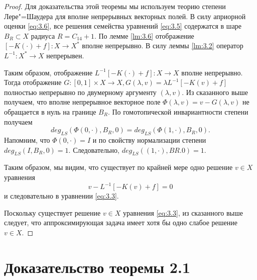 \begin{proof}
    Для доказательства этой теоремы мы используем теорию степени Лере"=Шаудера для вполне непрерывных 
    векторных полей. В силу априорной оценки \ref{eq:3.6}, все решения семейства уравнений \ref{eq:3.5} содержатся в шаре 
    $B_R \subset X$ радиуса $R = C_{14} +1$. По лемме \ref{lm:3.6} отображение $[-K (\cdot) + f]: X \rightarrow X^*$
    вполне непрерывно. В силу леммы \ref{lm:3.2} оператор $L^{-1}: X^*\rightarrow X$ непрерывен.

    Таким образом, отображение $L^{-1}[-K (\cdot) + f]: X \rightarrow X$ вполне непрерывно.  
    Тогда отображение $G:[0, 1] \times X\rightarrow X, G (\lambda, v) = \lambda L^{-1}[- K (v) + f]$ 
    полностью непрерывно по двумерному аргументу $(\lambda, v)$.  Из сказанного выше получаем, что вполне непрерывное 
    векторное поле $\Phi(\lambda, v) = v - G (\lambda, v)$ не обращается в нуль на границе $B_R$. По гомотопической 
    инвариантности степени получаем
    $$deg_{LS}(\Phi(0,\cdot),B_R,0)=deg_{LS}(\Phi(1,\cdot),B_R,0).$$
    Напомним, что $\Phi(0,\cdot) = I$ и по свойству нормализации степени $deg_{LS} (I, B_R, 0) = 1$. 
    Следовательно, $deg_{LS} ((1,\cdot), BR.0) = 1$. 
    
    Таким образом, мы видим, что существует по крайней мере одно решение $v\in X$ уравнения
    $$v-L^{-1}[-K(v)+f]=0$$
    и следовательно в уравнении \ref{eq:3.3}.

    Поскольку существует решение $v\in X$ уравнения \ref{eq:3.3}, из сказанного выше следует, 
    что аппроксимирующая задача имеет хотя бы одно слабое решение $v\in X$.
\end{proof}

\section{Доказательство теоремы 2.1}

